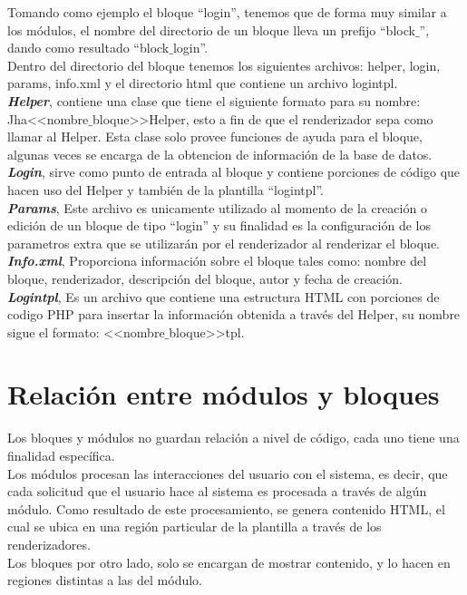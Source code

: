 Tomando como ejemplo el bloque ``login'', tenemos que de forma muy similar a los m\'odulos, el nombre del directorio de un bloque lleva un prefijo ``block$\_$'', dando como resultado ``block$\_$login''.\\

Dentro del directorio del bloque tenemos los siguientes archivos: helper, login, params, info.xml y el directorio html que contiene un archivo logintpl.\\

\textbf{\textit{Helper}}, contiene una clase que tiene el siguiente formato para su nombre: Jha<<nombre$\_$bloque>>Helper, esto a fin de que el renderizador sepa como llamar al Helper. Esta clase solo provee funciones de ayuda para el bloque, algunas veces se encarga de la obtencion de informaci\'on de la base de datos.\\



\textbf{\textit{Login}}, sirve como punto de entrada al bloque y contiene porciones de c\'odigo que hacen uso del Helper y tambi\'en de la plantilla ``logintpl''.\\



\textbf{\textit{Params}}, Este archivo es unicamente utilizado al momento de la creaci\'on o edici\'on de un bloque de tipo ``login'' y su finalidad es la configuraci\'on de los parametros extra que se utilizar\'an por el renderizador al renderizar el bloque.\\



\textbf{\textit{Info.xml}}, Proporciona informaci\'on sobre el bloque tales como: nombre del bloque, renderizador, descripci\'on del bloque, autor y fecha de creaci\'on.\\



\textbf{\textit{Logintpl}}, Es un archivo que contiene una estructura HTML con porciones de codigo PHP para insertar la informaci\'on obtenida a trav\'es del Helper, su nombre sigue el formato: <<nombre$\_$bloque>>tpl.\\



\section{Relaci\'on entre m\'odulos y bloques}
Los bloques y m\'odulos no guardan relaci\'on a nivel de c\'odigo, cada uno tiene una finalidad espec\'ifica.\\
Los m\'odulos procesan las interacciones del usuario con el sistema, es decir, que cada solicitud que el usuario hace al sistema es procesada a trav\'es de alg\'un m\'odulo. Como resultado de este procesamiento, se genera contenido HTML, el cual se ubica en una regi\'on particular de la plantilla a trav\'es de los renderizadores.\\
Los bloques por otro lado, solo se encargan de mostrar contenido, y lo hacen en regiones distintas a las del m\'odulo.

